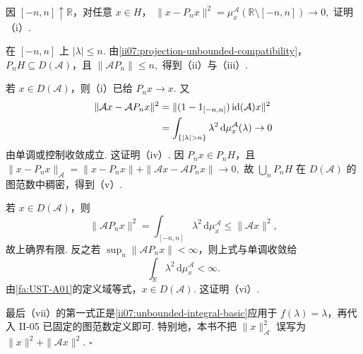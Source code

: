 \begin{FAProof}
因 \(\displaystyle[-n,n]\uparrow\mathbb R\)，对任意 \(\displaystyle x\in H\)，
\(\displaystyle \|x-P_nx\|^2 = \mu_x^{\mathcal A}(\mathbb R\setminus[-n,n]) \to0,\)
证明（i）.

在 \(\displaystyle[-n,n]\) 上 \(\displaystyle|\lambda|\leqslant n\). 由\autoref{ii07:projection-unbounded-compatibility}，\(\displaystyle P_nH\subseteq D(\mathcal A)\)，且
\(\displaystyle \|\mathcal AP_n\|\leqslant n,\)
得到（ii）与（iii）.

若 \(\displaystyle x\in D(\mathcal A)\)，则（i）已给 \(\displaystyle P_nx\to x\). 又
\[
\begin{aligned}
\displaystyle \|\mathcal Ax-\mathcal AP_nx\|^2 &\displaystyle =\|(1-1_{[-n,n]})\operatorname{id}(\mathcal A)x\|^2\\
\displaystyle &\displaystyle =\int_{\{|\lambda|>n\}}\lambda^2\,\mathrm{d}\mu_x^{\mathcal A}(\lambda) \to0
\end{aligned}
\]
由单调或控制收敛成立. 这证明（iv）. 因 \(\displaystyle P_nx\in P_nH\)，且
\(\displaystyle \|x-P_nx\|_{\mathcal A} = \|x-P_nx\|+\|\mathcal Ax-\mathcal AP_nx\| \to0,\)
故 \(\displaystyle\bigcup_nP_nH\) 在 \(\displaystyle D(\mathcal A)\) 的图范数中稠密，得到（v）.

若 \(\displaystyle x\in D(\mathcal A)\)，则
\[
\|\mathcal AP_nx\|^2
=
\int_{[-n,n]}\lambda^2\,\mathrm{d}\mu_x^{\mathcal A}
\leqslant
\|\mathcal Ax\|^2,
\]
故上确界有限. 反之若 \(\displaystyle\sup_n\|\mathcal AP_nx\|<\infty\)，则上式与单调收敛给
\[
\int_{\mathbb R}\lambda^2\,\mathrm{d}\mu_x^{\mathcal A}<\infty.
\]
由\autoref{fa:UST-A01}的定义域等式，\(\displaystyle x\in D(\mathcal A)\). 这证明（vi）.

最后（vii）的第一式正是\autoref{ii07:unbounded-integral-basic}应用于 \(\displaystyle f(\lambda)=\lambda\)，再代入 II-05 已固定的图范数定义即可. 特别地，本书不把 \(\displaystyle\|x\|_{\mathcal A}^2\) 误写为 \(\displaystyle\|x\|^2+\|\mathcal Ax\|^2\).
\hfill\(\square\)
\end{FAProof}

